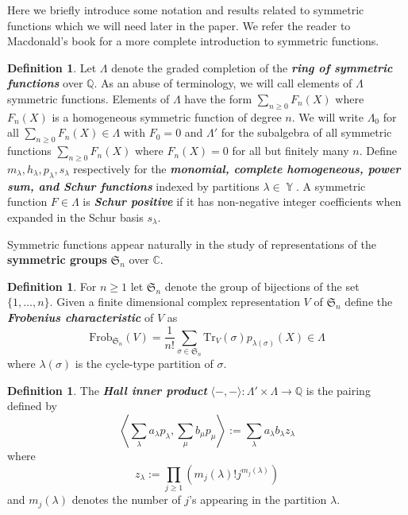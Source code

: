 \documentclass[12pt,reqno]{amsart}
\theoremstyle{definition}
\newtheorem{defn}[thm]{Definition}
\DeclareMathOperator{\Par}{\mathbb{Y}}
\begin{document}
Here we briefly introduce some notation and results related to symmetric functions which we will need later in the paper. We refer the reader to Macdonald's book \cite{Macdonald} for a more complete introduction to symmetric functions. 

\begin{defn}
    Let $\Lambda$ denote the graded completion of the \textit{\textbf{ring of symmetric functions}} over $\mathbb{Q}.$ As an abuse of terminology, we will call elements of $\Lambda$ symmetric functions. Elements of $\Lambda$ have the form $\sum_{n \geq 0} F_n(X)$ where $F_n(X)$ is a homogeneous symmetric function of degree $n$. We will write $\Lambda_0$ for all $\sum_{n \geq 0} F_n(X) \in \Lambda$ with $F_0 = 0$ and $\Lambda'$ for the subalgebra of all symmetric functions $\sum_{n \geq 0} F_n(X)$ where $F_n(X) = 0$ for all but finitely many $n.$ Define $m_{\lambda},h_{\lambda},p_{\lambda},s_{\lambda}$ respectively for the \textit{\textbf{monomial, complete homogeneous, power sum, and Schur functions}} indexed by partitions $\lambda \in \Par.$ A symmetric function $F \in \Lambda$ is \textit{\textbf{Schur positive}} if it has non-negative integer coefficients when expanded in the Schur basis $s_{\lambda}.$
\end{defn}

Symmetric functions appear naturally in the study of representations of the \textbf{symmetric groups} $\mathfrak{S}_n$ over $\mathbb{C}.$

\begin{defn}
    For $n \geq 1$ let $\mathfrak{S}_n$ denote the group of bijections of the set $\{1,\ldots,n\}.$ Given a finite dimensional complex representation $V$ of $\mathfrak{S}_n$ define the \textit{\textbf{Frobenius characteristic}} of $V$ as 
    $$\mathrm{Frob}_{\mathfrak{S}_n}(V) = \frac{1}{n!} \sum_{\sigma \in \mathfrak{S}_n} \mathrm{Tr}_{V}(\sigma) p_{\lambda(\sigma)}(X) \in \Lambda$$ where $\lambda(\sigma)$ is the cycle-type partition of $\sigma.$
\end{defn}


\begin{defn}
    The \textit{\textbf{Hall inner product}} $\langle - , - \rangle: \Lambda' \times \Lambda \rightarrow \mathbb{Q}$ is the pairing defined by 
    $$\left\langle \sum_{\lambda}a_{\lambda}p_{\lambda} , \sum_{\mu} b_{\mu} p_{\mu}\right \rangle:= \sum_{\lambda} a_{\lambda} b_{\lambda} z_{\lambda}$$ where 
    $$z_{\lambda}:= \prod_{j \geq 1} \left( m_j(\lambda)! j^{m_{j}(\lambda)} \right)$$ and $m_j(\lambda)$ denotes the number of $j$'s appearing in the partition $\lambda.$
\end{defn}
\end{document}
